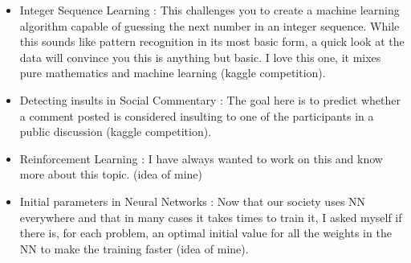 \documentclass{article}
\begin{document}
\begin{itemize}
  \item Integer Sequence Learning : This challenges you to create a machine learning algorithm capable of guessing the next number in an integer sequence. While this sounds like pattern recognition in its most basic form, a quick look at the data will convince you this is anything but basic. I love this one, it mixes pure mathematics and machine learning (kaggle competition).
  \item Detecting insults in Social Commentary : The goal here is to predict whether a comment posted is considered insulting to one of the participants in a public discussion (kaggle competition).
  \item Reinforcement Learning : I have always wanted to work on this and know more about this topic. (idea of mine)
  \item Initial parameters in Neural Networks : Now that our society uses NN everywhere and that in many cases it takes times to train it, I asked myself if there is, for each problem, an optimal initial value for all the weights in the NN to make the training faster (idea of mine).
\end{itemize}

\cite{bibtex}



\end{document}
